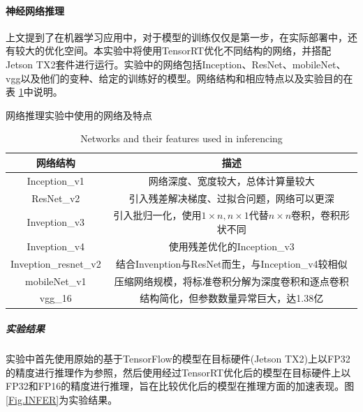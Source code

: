 \paragraph{神经网络推理}
\par 上文提到了在机器学习应用中，对于模型的训练仅仅是第一步，在实际部署中，还有较大的优化空间。本实验中将使用TensorRT优化不同结构的网络，并搭配Jetson TX2套件进行运行。实验中的网络包括Inception、ResNet、mobileNet、vgg以及他们的变种、给定的训练好的模型。网络结构和相应特点以及实验目的在表 \ref{table-NETWORKS}中说明。
\begin{table}
	\centering
	\renewcommand{\thetable}{\arabic{section}-\arabic{table} }
	\renewcommand{\tablename}{表}
	\caption{网络推理实验中使用的网络及特点}
	\addtocounter{table}{-1}
	\renewcommand{\thetable}{\arabic{section}-\arabic{table} }
	\renewcommand{\tablename}{Table}
	\caption{Networks and their features used in inferencing}
	\begin{tabular}{cc}
		\toprule
		网络结构	&	描述\\
		\midrule
		Inception\_v1 & 网络深度、宽度较大，总体计算量较大\\
		ResNet\_v2 & 引入残差解决梯度、过拟合问题，网络可以更深\\
		Inveption\_v3 & 引入批归一化，使用$ 1\times n, n\times 1 $代替$ n\times n $卷积，卷积形状不同\\
		Inveption\_v4 & 使用残差优化的Inception\_v3\\
		Inveption\_resnet\_v2 & 结合Invenption与ResNet而生，与Inception\_v4较相似\\
		mobileNet\_v1 & 压缩网络规模，将标准卷积分解为深度卷积和逐点卷积\\
		vgg\_16 &  结构简化，但参数数量异常巨大，达1.38亿\\
		\bottomrule
	\end{tabular} \label{table-NETWORKS} 
\end{table}
\subparagraph{实验结果}
\par 实验中首先使用原始的基于TensorFlow的模型在目标硬件(Jetson TX2)上以FP32的精度进行推理作为参照，然后使用经过TensorRT优化后的模型在目标硬件上以FP32和FP16的精度进行推理，旨在比较优化后的模型在推理方面的加速表现。图 \ref{Fig.INFER}为实验结果。
